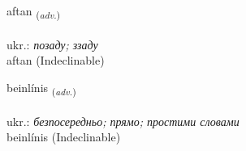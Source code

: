 \documentclass[frontgrid, backgrid]{flacards}\usepackage[]{graphicx}\usepackage[]{xcolor}
\begin{document}
\renewcommand{\blhead}{\vskip5pt {\small\bfseries\footnotesize Atviksorð | прислівник }}
\renewcommand{\bcfoot}{\vskip5pt \hspace{2pt}{\small\bfseries\footnotesize 2K}}


{aftan \small{\textsubscript{(\textit{adv.})}} \\[1ex]
\textphonetic{[aftan]} \\
ukr.: \emph{позаду; ззаду} \\  [2ex]
aftan (Indeclinable)}


\renewcommand{\flhead}{\vskip5pt \fboxsep=0pt {\small\bfseries\footnotesize Atviksorð | прислівник}}
\renewcommand{\fcfoot}{\vskip5pt \fboxsep=0pt \hspace{2pt}{\small\bfseries\footnotesize 2K}}

\renewcommand{\blhead}{\vskip5pt {\small\bfseries\footnotesize Atviksorð | прислівник }}
\renewcommand{\bcfoot}{\vskip5pt \hspace{2pt}{\small\bfseries\footnotesize 2K}}


{beinlínis \small{\textsubscript{(\textit{adv.})}} \\[1ex]
\textphonetic{[peinlinɪs]} \\
ukr.: \emph{безпосередньо; прямо; простими словами} \\  [2ex]
beinlínis (Indeclinable)}

\renewcommand{\flhead}{\vskip5pt \fboxsep=0pt {\small\bfseries\footnotesize Nafnorð | іменник}}
\renewcommand{\fcfoot}{\vskip5pt \fboxsep=0pt \hspace{2pt}{\small\bfseries\footnotesize 2K}}

\renewcommand{\blhead}{\vskip5pt {\small\bfseries\footnotesize Nafnorð | іменник }}
\renewcommand{\bcfoot}{\vskip5pt \hspace{2pt}{\small\bfseries\footnotesize 2K}}
\end{document}
